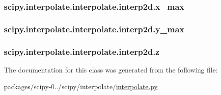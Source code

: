 \subsubsection[{x\+\_\+max}]{\setlength{\rightskip}{0pt plus 5cm}scipy.\+interpolate.\+interpolate.\+interp2d.\+x\+\_\+max}\label{classscipy_1_1interpolate_1_1interpolate_1_1interp2d_aa2576cd550fa9281e31028023d71ffd0}
\hypertarget{classscipy_1_1interpolate_1_1interpolate_1_1interp2d_a70c4e24eb28df2e48277e4e2d854c00b}{}
\subsubsection[{y\+\_\+max}]{\setlength{\rightskip}{0pt plus 5cm}scipy.\+interpolate.\+interpolate.\+interp2d.\+y\+\_\+max}\label{classscipy_1_1interpolate_1_1interpolate_1_1interp2d_a70c4e24eb28df2e48277e4e2d854c00b}
\hypertarget{classscipy_1_1interpolate_1_1interpolate_1_1interp2d_ad58b3135dee512b2cefe24ae986c2ddd}{}
\subsubsection[{z}]{\setlength{\rightskip}{0pt plus 5cm}scipy.\+interpolate.\+interpolate.\+interp2d.\+z}\label{classscipy_1_1interpolate_1_1interpolate_1_1interp2d_ad58b3135dee512b2cefe24ae986c2ddd}


The documentation for this class was generated from the following file\+:\begin{DoxyCompactItemize}
\item 
packages/scipy-\/0../scipy/interpolate/\hyperlink{interpolate_8py}{interpolate.\+py}\end{DoxyCompactItemize}
